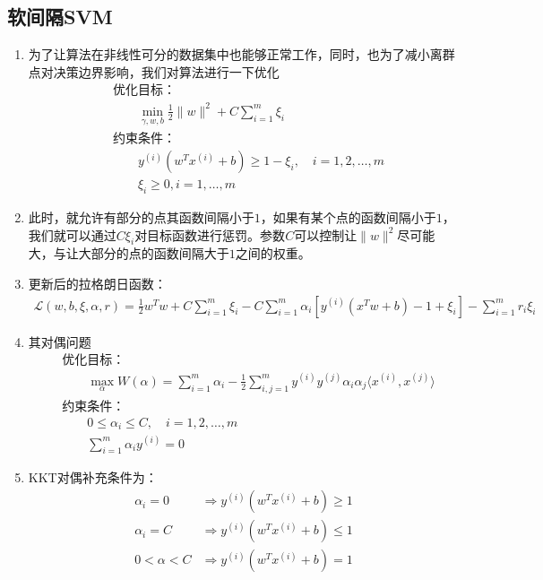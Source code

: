 
\subsection{软间隔SVM}
\begin{enumerate}
	\item 为了让算法在非线性可分的数据集中也能够正常工作，同时，也为了减小离群点对决策边界影响，我们对算法进行一下优化
	\begin{align}
		&\text{优化目标：} \\
		& \qquad \min_{\gamma, w, b} \frac{1}{2}\|w\|^2 + C\sum_{i=1}^{m}\xi_i \\
		&\text{约束条件：} \\
		& \qquad y^{(i)}(w^Tx^{(i)} + b) \geq 1-\xi_i, \quad i=1, 2, \dots, m \\
		& \qquad \xi_i \geq 0, i=1,\dots,m
	\end{align}
	\item 此时，就允许有部分的点其函数间隔小于$1$，如果有某个点的函数间隔小于$1$，我们就可以通过$C\xi_i$对目标函数进行惩罚。参数$C$可以控制让$\|w\|^2$尽可能大，与让大部分的点的函数间隔大于$1$之间的权重。
	\item 更新后的拉格朗日函数：
	\begin{align}
		\mathcal{L}(w,b,\xi,\alpha,r) = \frac{1}{2}w^Tw + C\sum_{i=1}^{m}\xi_i -C\sum_{i=1}^{m}\alpha_i\left[y^{(i)}(x^Tw + b)-1+\xi_i\right]-\sum_{i=1}^{m}r_i\xi_i
	\end{align}
	\item 其对偶问题
	\begin{align}
		&\text{优化目标：} \\
		& \qquad \max_{\alpha}W(\alpha)=\sum_{i=1}^{m} \alpha_i -\frac{1}{2}\sum_{i,j=1}^{m}y^{(i)}y^{(j)}\alpha_i\alpha_j\langle x^{(i)},x^{(j)} \rangle \\
		&\text{约束条件：} \\
		& \qquad 0 \leq \alpha_i \leq C, \quad i=1, 2, \dots, m \\
		& \qquad \sum_{i=1}^{m}\alpha_i y^{(i)} = 0
	\end{align}
	\item KKT对偶补充条件为：
	\begin{align}
		\alpha_i = 0 &\Rightarrow y^{(i)}(w^Tx^{(i)}+b) \geq 1\\
		\alpha_i = C &\Rightarrow y^{(i)}(w^Tx^{(i)}+b) \leq 1\\
		0 < \alpha < C &\Rightarrow y^{(i)}(w^Tx^{(i)}+b) = 1\\
	\end{align}

\end{enumerate}















